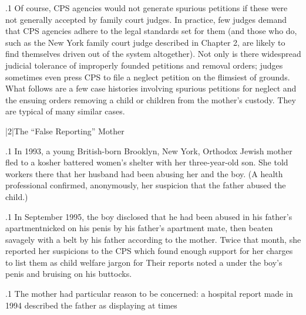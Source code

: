 \documentclass[11pt, twoside]{article}
\begin{document}
{\p.1{%
Of course, CPS agencies would not generate spurious petitions if
these were not generally accepted by family court judges. In practice,
few judges demand that CPS agencies adhere to the legal standards set
for them (and those who do, such as the New York family court judge
described in Chapter 2, are likely to find themselves driven out of the
system altogether). Not only is there widespread judicial tolerance of improperly founded petitions and removal orders; judges sometimes even
press CPS to file a neglect petition on the flimsiest of grounds.
What follows are a few case histories involving spurious petitions for
neglect and the ensuing orders removing a child or children from the
mother's custody. They are typical of many similar cases.
}%


\s|2|{The ``False Reporting'' Mother}

\p.1{%
In 1993, a young British-born Brooklyn, New York, Orthodox Jewish
mother fled to a kosher battered women's shelter with her three-year-old
son. She told workers there that her husband had been abusing her and
the boy. (A health professional confirmed, anonymously, her suspicion
that the father abused the child.)
}%

\p.1{%
In September 1995, the boy disclosed that he had been abused in his
father's apartment\mdash{}nicked on his penis by his father's apartment mate,
then beaten savagely with a belt by his father\mdash{} according to the mother. Twice that month, she reported her suspicions to the CPS  which found enough support
for her charges to list them as  child welfare jargon for  Their reports noted a  under the boy's penis and
bruising on his buttocks.
}%

\p.1{%
The mother had particular reason to be concerned: a hospital report
made in 1994 described the father as  displaying at times 
}%

}
\end{document}
